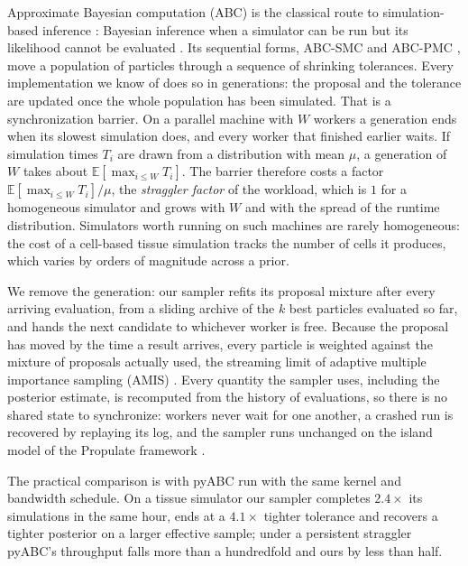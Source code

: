 \documentclass[10pt]{article}
\theoremstyle{plain}
\theoremstyle{definition}
\begin{document}
Approximate Bayesian computation (ABC) is the classical route to simulation-based inference \citep{cranmer2020frontier}: Bayesian inference when a simulator can be run but its likelihood cannot be evaluated \citep{beaumont2019abc}. Its sequential forms, ABC-SMC and ABC-PMC \citep{sisson2007,toni2009abcsmc,beaumont2009adaptive,delmoral2012adaptive}, move a population of particles through a sequence of shrinking tolerances. Every implementation we know of does so in generations: the proposal and the tolerance are updated once the whole population has been simulated. That is a synchronization barrier. On a parallel machine with $W$ workers a generation ends when its slowest simulation does, and every worker that finished earlier waits. If simulation times $T_i$ are drawn from a distribution with mean $\mu$, a generation of $W$ takes about $\mathbb{E}[\max_{i\le W}T_i]$. The barrier therefore costs a factor $\mathbb{E}[\max_{i\le W}T_i]/\mu$, the \emph{straggler factor} of the workload, which is $1$ for a homogeneous simulator and grows with $W$ and with the spread of the runtime distribution. Simulators worth running on such machines are rarely homogeneous: the cost of a cell-based tissue simulation tracks the number of cells it produces, which varies by orders of magnitude across a prior.

We remove the generation: our sampler refits its proposal mixture after every arriving evaluation, from a sliding archive of the $k$ best particles evaluated so far, and hands the next candidate to whichever worker is free. Because the proposal has moved by the time a result arrives, every particle is weighted against the mixture of proposals actually used, the streaming limit of adaptive multiple importance sampling (AMIS) \citep{cornuet2012amis}. Every quantity the sampler uses, including the posterior estimate, is recomputed from the history of evaluations, so there is no shared state to synchronize: workers never wait for one another, a crashed run is recovered by replaying its log, and the sampler runs unchanged on the island model of the Propulate framework \citep{taubert2023propulate}.

The practical comparison is with pyABC \citep{klinger2018pyabc} run with the same kernel and bandwidth schedule. On a tissue simulator our sampler completes $2.4\times$ its simulations in the same hour, ends at a $4.1\times$ tighter tolerance and recovers a tighter posterior on a larger effective sample; under a persistent straggler pyABC's throughput falls more than a hundredfold and ours by less than half.
\end{document}

